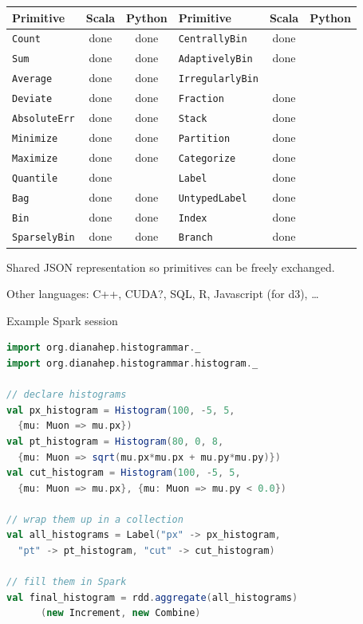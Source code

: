 \documentclass{beamer}
\begin{document}
\begin{frame}{}
\vfill
\hspace{-0.5 cm}\begin{minipage}{\linewidth}
\renewcommand{\arraystretch}{1.2}
\begin{tabular}{l c c | l c c}
Primitive & Scala & Python & Primitive & Scala & Python \\\hline
{\tt \small Count}       & done & done & {\tt \small CentrallyBin}    & done & \\
{\tt \small Sum}         & done & done & {\tt \small AdaptivelyBin}   & done & \\
{\tt \small Average}     & done & done & {\tt \small IrregularlyBin}  &      & \\    
{\tt \small Deviate}     & done & done & {\tt \small Fraction}        & done & \\
{\tt \small AbsoluteErr} & done & done & {\tt \small Stack}           & done & \\
{\tt \small Minimize}    & done & done & {\tt \small Partition}       & done & \\
{\tt \small Maximize}    & done & done & {\tt \small Categorize}      & done & \\
{\tt \small Quantile}    & done &      & {\tt \small Label}           & done & \\
{\tt \small Bag}         & done & done & {\tt \small UntypedLabel}    & done & \\
{\tt \small Bin}         & done & done & {\tt \small Index}           & done & \\
{\tt \small SparselyBin} & done & done & {\tt \small Branch}          & done & \\
\end{tabular}
\end{minipage}

\vfill
Shared JSON representation so primitives can be freely exchanged.

\vfill
Other languages: C++, CUDA?, SQL, R, Javascript (for d3), \ldots
\end{frame}

\begin{frame}[fragile]{Example Spark session}
\begin{lstlisting}[language=scala]
import org.dianahep.histogrammar._
import org.dianahep.histogrammar.histogram._

// declare histograms
val px_histogram = Histogram(100, -5, 5,
  {mu: Muon => mu.px})
val pt_histogram = Histogram(80, 0, 8,
  {mu: Muon => sqrt(mu.px*mu.px + mu.py*mu.py)})
val cut_histogram = Histogram(100, -5, 5,
  {mu: Muon => mu.px}, {mu: Muon => mu.py < 0.0})

// wrap them up in a collection
val all_histograms = Label("px" -> px_histogram,
  "pt" -> pt_histogram, "cut" -> cut_histogram)

// fill them in Spark
val final_histogram = rdd.aggregate(all_histograms)
      (new Increment, new Combine)
\end{lstlisting}
\end{frame}
\end{document}
